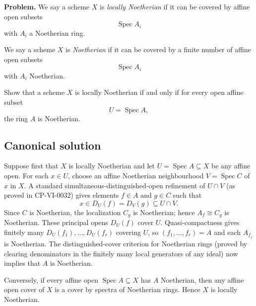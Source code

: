 
\textbf{Problem.}
We say a scheme \(X\) is \emph{locally Noetherian} if it can be covered by affine open subsets
\[
\operatorname{Spec} A_i
\]
with \(A_i\) a Noetherian ring.

We say a scheme \(X\) is \emph{Noetherian} if it can be covered by a finite number of affine open subsets
\[
\operatorname{Spec} A_i
\]
with \(A_i\) Noetherian.

Show that a scheme \(X\) is locally Noetherian if and only if for every open affine subset
\[
U=\operatorname{Spec} A,
\]
the ring \(A\) is Noetherian.

\subsection*{Canonical solution}
Suppose first that $X$ is locally Noetherian and let
$U=\operatorname{Spec} A\subseteq X$ be any affine open.
For each $x\in U$, choose an affine Noetherian neighbourhood
$V=\operatorname{Spec} C$ of $x$ in $X$. A standard
simultaneous-distinguished-open refinement of $U\cap V$
(as proved in CP-VI-0032) gives elements $f\in A$ and $g\in C$
such that
\[
x\in D_U(f)=D_V(g)\subseteq U\cap V.
\]
Since $C$ is Noetherian, the localization $C_g$ is Noetherian;
hence $A_f\cong C_g$ is Noetherian. These principal opens $D_U(f)$
cover $U$. Quasi-compactness gives finitely many
$D_U(f_1),\ldots,D_U(f_r)$ covering $U$, so
$(f_1,\ldots,f_r)=A$ and each $A_{f_j}$ is Noetherian.
The distinguished-cover criterion for Noetherian rings (proved by
clearing denominators in the finitely many local generators of any
ideal) now implies that $A$ is Noetherian.

Conversely, if every affine open $\operatorname{Spec} A\subseteq X$ has $A$ Noetherian, then any affine open cover of $X$ is a cover by spectra of Noetherian rings. Hence $X$ is locally Noetherian.
